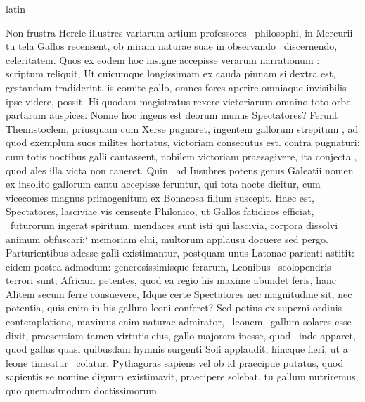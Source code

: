 \documentclass[12pt]{book}
\renewenvironment{latin}
    	{\begin{hyphenrules}{latin}}
    	{\end{hyphenrules}}
\begin{document}
\begin{pages}
\begin{latin}
\begin{Leftside}
                  Non frustra Hercle illustres variarum artium professores  \ampersand\ philosophi, in Mercurii tu tela Gallos recensent, ob miram naturae suae in observando  \ampersand\ discernendo, celeritatem.
                  Quos ex eodem hoc insigne accepisse verarum narrationum : scriptum reliquit, 
                  Ut cuicumque longissimam ex cauda pinnam si dextra est, gestandam tradiderint, is comite gallo, omnes fores aperire omniaque invisibilis ipse videre, possit. 
                  Hi quodam magistratus rexere victoriarum omnino toto orbe partarum auspices. Nonne hoc ingens est deorum munus Spectatores? Ferunt Themistoclem,  priusquam
                  cum Xerse pugnaret, ingentem gallorum strepitum , ad quod exemplum suos milites hortatus, victoriam consecutus est.
                   contra  pugnaturi: cum totis noctibus galli cantassent, nobilem victoriam praesagivere, 
                  ita conjecta , quod ales illa victa non caneret. Quin  \ampersand\ ad Insubres potens
                  genus Galeatii nomen ex insolito gallorum cantu accepisse feruntur, qui tota nocte dicitur, cum vicecomes magnus primogenitum ex Bonacosa filium suscepit.
                  Haec est, Spectatores, lasciviae vis censente Philonico, ut Gallos fatidicos efficiat,  \ampersand\ futurorum ingerat spiritum, mendaces sunt isti qui lascivia, corpora dissolvi animum obfuscari:`
                  memoriam elui, multorum applausu docuere sed pergo. Parturientibus adesse galli existimantur, postquam unus Latonae parienti astitit: eidem postea  admodum: 
                  generosissimisque ferarum, Leonibus  \ampersand\ scolopendris terrori sunt;  Africam petentes, quod ea regio his maxime abundet feris, 
                  hanc Alitem secum ferre consuevere, Idque certe Spectatores nec magnitudine sit, nec potentia, quis enim in his gallum leoni conferet? Sed potius ex superni ordinis contemplatione, maximus enim naturae admirator,
                   \ampersand\ leonem  \ampersand\ gallum solares esse dixit, praesentiam tamen virtutis eius, gallo majorem inesse, quod  \ampersand\ inde apparet, quod gallus quasi quibusdam hymnis surgenti Soli applaudit, hincque fieri, ut a leone timeatur  \ampersand\ colatur.
                  Pythagoras sapiens vel ob id praecipue putatus, quod sapientis se nomine dignum  existimavit, praecipere solebat, tu gallum nutriremus, quo quemadmodum doctissimorum

\end{Leftside}
\end{latin}
\end{pages}
\end{document}
